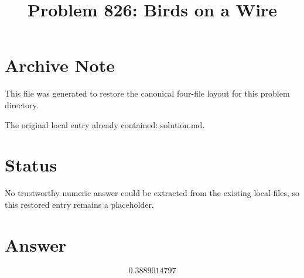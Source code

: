\documentclass[11pt]{article}
\title{Problem 826: Birds on a Wire}
\author{}
\date{}
\begin{document}
\maketitle

\section{Archive Note}
This file was generated to restore the canonical four-file layout for this problem directory.

The original local entry already contained: solution.md.

\section{Status}

No trustworthy numeric answer could be extracted from the existing local files, so this restored entry remains a placeholder.

\section{Answer}

\[
\boxed{0.3889014797}
\]
\end{document}
